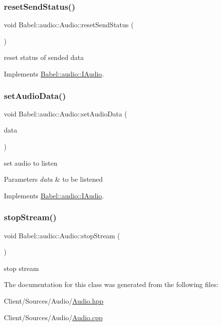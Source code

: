 \subsubsection{\texorpdfstring{reset\+Send\+Status()}{resetSendStatus()}}
{\footnotesize\ttfamily void Babel\+::audio\+::\+Audio\+::reset\+Send\+Status (\begin{DoxyParamCaption}{ }\end{DoxyParamCaption})\hspace{0.3cm}{\ttfamily [virtual]}}

reset status of sended data 

Implements \hyperlink{classBabel_1_1audio_1_1IAudio_a76c3b8c9e9dd82f13ec7684b453d7f2c}{Babel\+::audio\+::\+I\+Audio}.

\mbox{\label{classBabel_1_1audio_1_1Audio_aed1e83c0c55e57cf785657f3988fccd1}} 
\subsubsection{\texorpdfstring{set\+Audio\+Data()}{setAudioData()}}
{\footnotesize\ttfamily void Babel\+::audio\+::\+Audio\+::set\+Audio\+Data (\begin{DoxyParamCaption}\item[{\hyperlink{structaudioData}{audio\+Data} \&}]{data }\end{DoxyParamCaption})\hspace{0.3cm}{\ttfamily [virtual]}}

set audio to listen 
\begin{DoxyParams}{Parameters}
{\em data} & to be listened \\
\hline
\end{DoxyParams}


Implements \hyperlink{classBabel_1_1audio_1_1IAudio_a6bac02d16b744cd8c81e5dd67636db0f}{Babel\+::audio\+::\+I\+Audio}.

\mbox{\label{classBabel_1_1audio_1_1Audio_a8e56e50b051bc6b92ab7afc66e99989b}} 
\subsubsection{\texorpdfstring{stop\+Stream()}{stopStream()}}
{\footnotesize\ttfamily void Babel\+::audio\+::\+Audio\+::stop\+Stream (\begin{DoxyParamCaption}{ }\end{DoxyParamCaption})}

stop stream 

The documentation for this class was generated from the following files\+:\begin{DoxyCompactItemize}
\item 
Client/\+Sources/\+Audio/\hyperlink{Audio_8hpp}{Audio.\+hpp}\item 
Client/\+Sources/\+Audio/\hyperlink{Audio_8cpp}{Audio.\+cpp}\end{DoxyCompactItemize}
